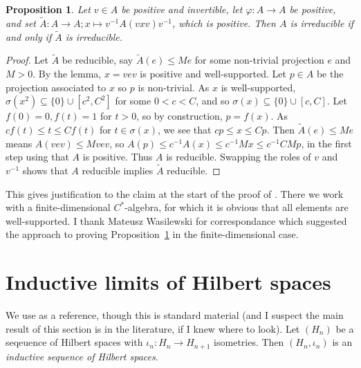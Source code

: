 \documentclass[twoside,a4paper,12pt]{article}
\theoremstyle{plain}
\newtheorem{proposition}{Proposition}[section]
\theoremstyle{definition}
\begin{document}
\begin{proposition}\label{prop:twisting_irred}
Let $v\in A$ be positive and invertible, let $\varphi\colon A\to A$ be positive, and set $\tilde A \colon A\to A; x \mapsto v^{-1} A(vxv) v^{-1}$, which is positive.  Then $A$ is irreducible if and only if $\tilde A$ is irreducible.
\end{proposition}
\begin{proof}
Let $\tilde A$ be reducible, say $\tilde A(e) \leq M e$ for some non-trivial projection $e$ and $M>0$.  By the lemma, $x=vev$ is positive and well-supported.  Let $p\in A$ be the projection associated to $x$ so $p$ is non-trivial.  As $x$ is well-supported, $\sigma(x^2) \subseteq \{0\} \cup [c^2,C^2]$ for some $0<c<C$, and so $\sigma(x) \subseteq \{0\} \cup [c,C]$.  Let $f(0)=0, f(t)=1$ for $t>0$, so by construction, $p = f(x)$.  As $cf(t) \leq t \leq Cf(t)$ for $t\in\sigma(x)$, we see that $c p \leq x \leq Cp$.  Then $\tilde A(e) \leq Me$ means $A(vev) \leq M vev$, so $A(p) \leq c^{-1} A(x) \leq c^{-1} M x \leq c^{-1}CM p$, in the first step using that $A$ is positive.  Thus $A$ is reducible.  Swapping the roles of $v$ and $v^{-1}$ shows that $A$ reducible implies $\tilde A$ reducible.
\end{proof}

This gives justification to the claim at the start of the proof of \cite[Proposition~4.3]{cgw}.  There we work with a finite-dimensional $C^*$-algebra, for which it is obvious that all elements are well-supported.  I thank Mateusz Wasilewski for correspondance which suggested the approach to proving Proposition~\ref{prop:twisting_irred} in the finite-dimensional case.



\section{Inductive limits of Hilbert spaces}

We use \cite[Chapter~XIV]{tak3} as a reference, though this is standard material (and I suspect the main result of this section is in the literature, if I knew where to look).  Let $(H_n)$ be a seqeuence of Hilbert spaces with $\iota_n\colon H_n \to H_{n+1}$ isometries.  Then $(H_n,\iota_n)$ is an \emph{inductive sequence of Hilbert spaces}.
\end{document}
